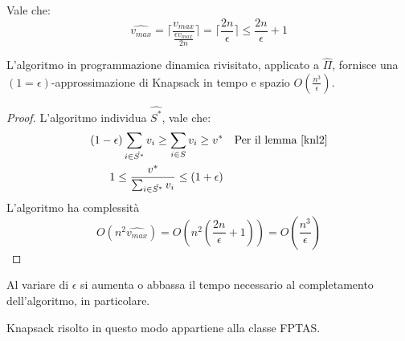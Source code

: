 \begin{remark}
    Vale che:
    $$\hat{v_{max}} = \lceil\frac{v_{max}}{\frac{\epsilon v_{max}}{2n}}\rceil = \lceil\frac{2n}{\epsilon}\rceil
    \leq \frac{2n}{\epsilon} + 1$$
\end{remark}
\begin{corollary}
    L'algoritmo in programmazione dinamica rivisitato, applicato a $\hat{\Pi}$, fornisce una
    $(1=\epsilon)$-approssimazione di Knapsack in tempo e spazio $O(\frac{n^3}{\epsilon})$.
\end{corollary}
\begin{proof}
    L'algoritmo individua $\hat{S^*}$, vale che:
    \begin{equation}
        \begin{aligned}
            (1-\epsilon)\sum_{i\in \hat{S^*}}v_i \geq \sum_{i \in S} v_i \geq v^* &&\text{Per il lemma \ref{knl2}}\\
            1 \leq \frac{v^*}{\sum_{i\in \hat{S^*}}v_i} \leq (1+\epsilon)
        \end{aligned}
    \end{equation}
    L'algoritmo ha complessità 
    $$O(n^2 \hat{v_{max}}) = O(n^2(\frac{2n}{\epsilon} + 1)) = O(\frac{n^3}{\epsilon})$$
\end{proof}
\begin{remark}
    Al variare di $\epsilon$ si aumenta o abbassa il tempo necessario al completamento dell'algoritmo, 
    in particolare.
\end{remark}
\begin{corollary}
    Knapsack risolto in questo modo appartiene alla classe FPTAS.
\end{corollary}